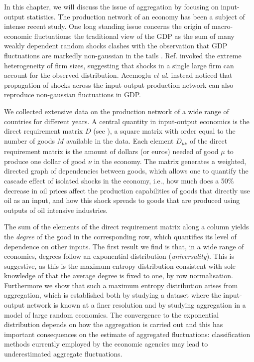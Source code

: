 In this chapter, we will discuss the issue of aggregation by focusing on
input-output statistics. The production network of an economy has been
a subject of intense recent study. One long standing issue concerns
the origin of macro-economic fluctuations: the traditional view of the
GDP as the sum of many weakly dependent random shocks clashes with the
observation that GDP fluctuations are markedly non-gaussian in the
tails \cite{non-gaussGDP}. Ref. \cite{Gabaix} invoked the extreme
heterogeneity of firm sizes, suggesting that shocks in a single large
firm can account for the observed distribution.  Acemoglu {\em et al.}
\cite{Acemoglu12} instead noticed that propagation of shocks across
the input-output production network can also reproduce non-gaussian
fluctuations in GDP.

We collected extensive data on the production network of a wide range
of countries for different years.  A central quantity in input-output
economics is the direct requirement matrix $D$ (see \cite{Acemoglu12,BEA_handbook}), a square matrix with order equal to the number of
goods $M$ available in the data. Each element $D_{\mu\nu}$ of the
direct requirement matrix is the amount of dollars (or euros) needed
of good $\mu$ to produce one dollar of good $\nu$ in the economy. The
matrix generates a weighted, directed graph of dependencies between
goods, which allows one to quantify the cascade effect of isolated
shocks in the economy, i.e., how much does a 50\% decrease in oil
prices affect the production capabilities of goods that directly use
oil as an input, and how this shock spreads to goods that are produced
using outputs of oil intensive industries.

The sum of the elements of the direct requirement matrix along a
column yields the {\em degree} of the good in the corresponding row,
which quantifies its level of dependence on other inputs.  The first
result we find is that, in a wide range of economies,
degrees follow an exponential distribution ({\em universality}). This
is suggestive, as this is the maximum entropy distribution consistent
with sole knowledge of that the average degree is fixed to one, by row
normalisation.  Furthermore we show that such a maximum entropy
distribution arises from aggregation, which is established both by
studying a dataset where the input-output network is known at a finer
resolution and by studying aggregation in a model of large random
economies.  The convergence to the exponential distribution depends on
how the aggregation is carried out and this has important consequences
on the estimate of aggregated fluctuations: classification methods
currently employed by the economic agencies may lead to underestimated
aggregate fluctuations.


